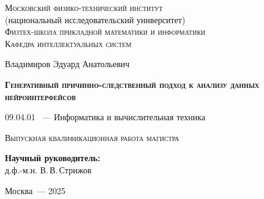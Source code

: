 \thispagestyle{empty}

\begin{titlepage}
	\begin{center}
		\textsc{Московский физико-технический институт}\\
		(национальный исследовательский университет)\\
		\textsc{Физтех-школа прикладной математики и информатики}\\
		\textsc{Кафедра интеллектуальных систем}
	\end{center}
	\vspace{2.5cm}
	\begin{center}
		{Владимиров Эдуард Анатольевич}
		\par
		\vspace{2cm}
		{\Large \textsc{\textbf{Генеративный причинно-следственный подход к анализу данных нейроинтерфейсов}}}
		\par
		\vspace{2cm}
		{09.04.01 ~--- Информатика и вычислительная техника}
		\par
		\vspace{2cm}
		\textsc{Выпускная квалификационная работа магистра}
	\end{center}
	\vspace{2cm}
	\hfill\parbox{8,4cm}{\textbf{Научный руководитель:}
		\\д.ф.-м.н. В.\,В.\,Стрижов}
	\par
	\vspace{2cm}
	\begin{center}
		{Москва~--- 2025}
	\end{center}
\end{titlepage}